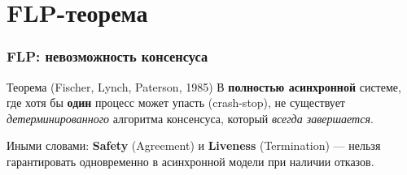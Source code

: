 \documentclass{beamer}
\begin{document}
\section{FLP-теорема}

\begin{frame}
\frametitle{FLP: невозможность консенсуса}

\begin{alertblock}{Теорема (Fischer, Lynch, Paterson, 1985)}
В \textbf{полностью асинхронной} системе, где хотя бы \textbf{один} процесс может
упасть (crash-stop), не существует \emph{детерминированного} алгоритма консенсуса,
который \emph{всегда завершается}.
\end{alertblock}

\vspace{0.5em}
Иными словами: \textbf{Safety} (Agreement) и \textbf{Liveness} (Termination) ---
нельзя гарантировать одновременно в асинхронной модели при наличии отказов.

\end{frame}




\end{document}
